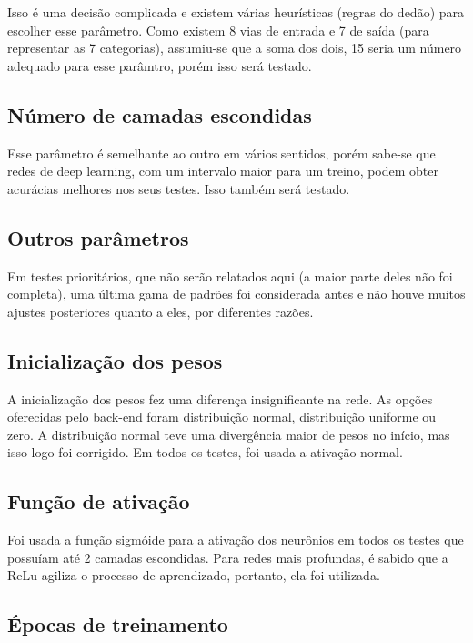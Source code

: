 \documentclass[11pt]{article}
\begin{document}
Isso é uma decisão complicada e existem várias heurísticas (regras do dedão) para escolher esse parâmetro. Como existem 8 vias de entrada e 7 de saída (para representar as 7 categorias), assumiu-se que a soma dos dois, 15 seria um número adequado para esse parâmtro, porém isso será testado.

\subsection*{Número de camadas escondidas}

Esse parâmetro é semelhante ao outro em vários sentidos, porém sabe-se que redes de deep learning, com um intervalo maior para um treino, podem obter acurácias melhores nos seus testes. Isso também será testado.

\subsection{Outros parâmetros}

Em testes prioritários, que não serão relatados aqui (a maior parte deles não foi completa), uma última gama de padrões foi considerada antes e não houve muitos ajustes posteriores quanto a eles, por diferentes razões.

\subsection*{Inicialização dos pesos}

A inicialização dos pesos fez uma diferença insignificante na rede. As opções oferecidas pelo back-end foram distribuição normal, distribuição uniforme ou zero. A distribuição normal teve uma divergência maior de pesos no início, mas isso logo foi corrigido. Em todos os testes, foi usada a ativação normal.

\subsection*{Função de ativação}

Foi usada a função sigmóide para a ativação dos neurônios em todos os testes que possuíam até 2 camadas escondidas. Para redes mais profundas, é sabido que a ReLu agiliza o processo de aprendizado, portanto, ela foi utilizada.

\subsection*{Épocas de treinamento}
\end{document}

